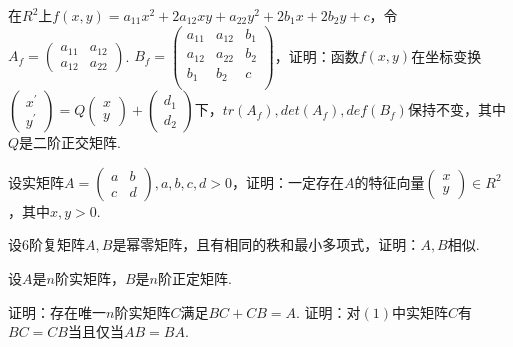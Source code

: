 \documentclass{BHCexam}
\begin{document}
\begin{groups}
        \begin{questions}
            \question[20]
            在$R^2$上$f(x,y)=a_{11}x^2+2a_{12}xy+a_{22}y^2+2b_1x+2b_2y+c$，令$A_f=\begin{pmatrix}
                a_{11} & a_{12} \\
                a_{12} & a_{22}
            \end{pmatrix}$. $B_f=\begin{pmatrix}
                a_{11} & a_{12} & b_1 \\
                a_{12} & a_{22} & b_2 \\
                b_{1} & b_{2} & c \\
            \end{pmatrix}$，证明：函数$f(x,y)$在坐标变换$\begin{pmatrix}
                x^\prime \\
                y ^\prime
            \end{pmatrix}= Q \begin{pmatrix}
                x \\ y
            \end{pmatrix}+ \begin{pmatrix}
                d_1 \\ d_2
            \end{pmatrix}下$，$tr(A_f),det(A_f),def(B_f)$保持不变，其中$Q$是二阶正交矩阵.
        \end{questions}

        \begin{questions}
            \question[20]
            设实矩阵$A=\begin{pmatrix}
                a & b \\ c & d
            \end{pmatrix},a,b,c,d>0$，证明：一定存在$A$的特征向量$\begin{pmatrix}
                x \\ y
            \end{pmatrix} \in R^2$，其中$x,y>0$.
        \end{questions}

        \begin{questions}
            \question[15]
            设$6$阶复矩阵$A,B$是幂零矩阵，且有相同的秩和最小多项式，证明：$A,B$相似.
        \end{questions}

        \begin{questions}
            \question[20]
            设$A$是$n$阶实矩阵，$B$是$n$阶正定矩阵.
            \begin{subquestions}
                \subquestion 证明：存在唯一$n$阶实矩阵$C$满足$BC+CB=A$.
                \subquestion 证明：对$(1)$中实矩阵$C$有$BC=CB$当且仅当$AB=BA$.
            \end{subquestions}
        \end{questions}
	\end{groups}
\end{document}
